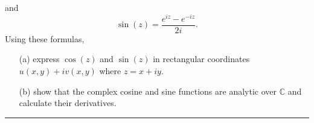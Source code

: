 \documentclass{article}
\begin{document}
		and 
		\[  \sin(z) = \frac{e^{iz} - e^{-iz}}{2i}. \]
		Using these formulas,
		\begin{enumerate}
			\item[(a)] express $\cos(z)$ and $\sin(z)$ in rectangular coordinates $u(x,y) + iv (x,y)$ where $z = x + iy$.
			\item[(b)] show that the complex cosine and sine functions are analytic over $\mathbb{C}$ and calculate their derivatives.
		\end{enumerate}
		

\vspace{.5cm} %

\hrule

\end{document}
